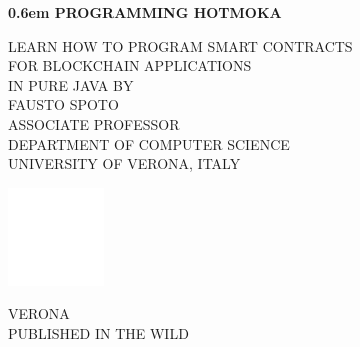 \BgThispage
\newcommand\nbvspace[1][3]{\vspace*{\stretch{#1}}}
\newcommand\nbstretchyspace{\spaceskip0.5em plus 0.25em minus 0.25em}
\newcommand{\nbtitlestretch}{\spaceskip0.6em}
\pagestyle{empty}
\begin{center}
\bfseries
\nbvspace[1]
\Huge
{\nbtitlestretch\huge
PROGRAMMING HOTMOKA}

\nbvspace[1]
\normalsize

LEARN HOW TO PROGRAM SMART CONTRACTS\\
FOR BLOCKCHAIN APPLICATIONS\\
IN PURE JAVA
\nbvspace[1]
\small BY\\
\Large FAUSTO SPOTO\\[0.5em]
\footnotesize ASSOCIATE PROFESSOR\\
DEPARTMENT OF COMPUTER SCIENCE\\
UNIVERSITY OF VERONA, ITALY

\nbvspace[2]

\includegraphics[width=1in]{./pics/logo_minimal.png}
\nbvspace[3]
\normalsize

VERONA\\
\large
PUBLISHED IN THE WILD
\nbvspace[1]
\end{center}
